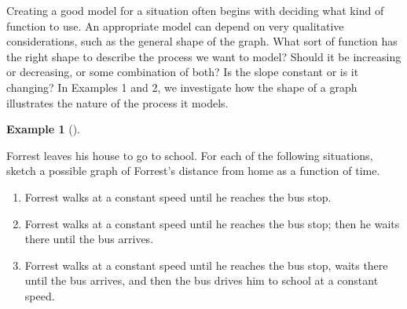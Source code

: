 \documentclass[10pt,]{book}
\theoremstyle{plain}
\theoremstyle{definition}
\theoremstyle{definition}
\theoremstyle{definition}
\newtheorem{example}[theorem]{Example}
\theoremstyle{definition}
\theoremstyle{definition}
\numberwithin{equation}{section}
\begin{document}
    Creating a good model for a situation often begins with deciding what kind of function to use. An appropriate model can depend on very qualitative considerations, such as the general shape of the graph. What sort of function has the right shape to describe the process we want to model? Should it be increasing or decreasing, or some combination of both? Is the slope constant or is it changing? In Examples 1 and 2, we investigate how the shape of a graph illustrates the nature of the process it models.
%
\begin{example}[]\label{example-home-to-school}

        Forrest leaves his house to go to school. For each of the following situations, sketch a possible graph of Forrest's distance from home as a function of time.
        \leavevmode%
\begin{enumerate}[label=*\alph**]
\item\hypertarget{li-317}{}Forrest walks at a constant speed until he reaches the bus stop.\item\hypertarget{li-318}{}Forrest walks at a constant speed until he reaches the bus stop; then he waits there until the bus arrives.\item\hypertarget{li-319}{}Forrest walks at a constant speed until he reaches the bus stop, waits there until the bus arrives, and then the bus drives him to school at a constant speed.\end{enumerate}


\end{example}
\end{document}
